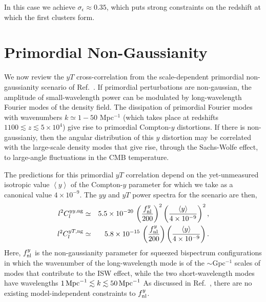 \documentclass[aps,twocolumn,floats,prd,nofootinbib]{revtex4-1}
\def\VEV#1{\left\langle #1 \right\rangle}
\begin{document}
In this case we achieve $\sigma_\epsilon \approx 0.35$, which puts strong 
constraints on the redshift at which the first clusters form.

\section{Primordial Non-Gaussianity}

We now review the $yT$ cross-correlation from the
scale-dependent primordial non-gaussianity scenario of
Ref.~\cite{Emami:2015xqa}.  If primordial perturbations are
non-gaussian, the amplitude of small-wavelength power can be
modulated by long-wavelength Fourier modes of the density
field.  The dissipation of primordial Fourier modes with
wavenumbers $k\simeq 1-50$ Mpc$^{-1}$ (which takes place at
redshifts $1100 \lesssim z \lesssim 5\times 10^4$) give rise to
primordial Compton-$y$ distortions.  If there is non-gaussianiy,
then the angular distribution of this $y$ distortion may be
correlated with the large-scale density modes that give rise,
through the Sachs-Wolfe effect, to large-angle fluctuations in
the CMB temperature.

The predictions for this primordial $yT$ correlation depend on the
yet-unmeasured isotropic value $\VEV{y}$ of the Compton-$y$
parameter for which we take as a canonical value $4\times
10^{-9}$.  The $yy$ and $yT$ power spectra for the scenario are
then, 
\begin{eqnarray}
     l^2 C_l^{yy,{\rm ng}} &\simeq& 5.5\times10^{-20} \, \left( \frac{
     f_{\rm nl}^y}{200} \right)^2 \left(\frac{\VEV{y}}{4\times
     10^{-9}} \right)^2, \\
     l^2 C_l^{yT,{\rm ng}} &\simeq& 5.8\times10^{-15} \, \left( \frac{
     f_{\rm nl}^y}{200} \right) \left(\frac{\VEV{y}}{4\times
     10^{-9}} \right).
\end{eqnarray}
Here, $f_{\rm nl}^y$ is the non-gaussianity parameter for
squeezed bispectrum configurations in which the wavenumber of
the long-wavelength mode is of the $\sim$Gpc$^{-1}$ scales of
modes that contribute to the ISW effect, while the two
short-wavelength modes have wavelengths $1\,{\rm Mpc}^{-1}
\lesssim k \lesssim 50\,{\rm Mpc}^{-1}$
As discussed in Ref.~\cite{Emami:2015xqa}, there are no
existing model-independent constraints to $f_{\rm nl}^y$.
\end{document}
